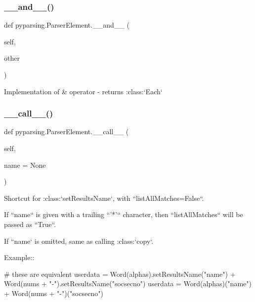 \subsubsection{\texorpdfstring{\+\_\+\+\_\+and\+\_\+\+\_\+()}{\_\_and\_\_()}}
{\footnotesize\ttfamily def pyparsing.\+Parser\+Element.\+\_\+\+\_\+and\+\_\+\+\_\+ (\begin{DoxyParamCaption}\item[{}]{self,  }\item[{}]{other }\end{DoxyParamCaption})}

\begin{DoxyVerb}Implementation of & operator - returns :class:`Each`
\end{DoxyVerb}
 \mbox{\label{classpyparsing_1_1ParserElement_a46450a967b8cf18e76e893532de0ecd7}} 
\subsubsection{\texorpdfstring{\+\_\+\+\_\+call\+\_\+\+\_\+()}{\_\_call\_\_()}}
{\footnotesize\ttfamily def pyparsing.\+Parser\+Element.\+\_\+\+\_\+call\+\_\+\+\_\+ (\begin{DoxyParamCaption}\item[{}]{self,  }\item[{}]{name = {\ttfamily None} }\end{DoxyParamCaption})}

\begin{DoxyVerb}Shortcut for :class:`setResultsName`, with ``listAllMatches=False``.

If ``name`` is given with a trailing ``'*'`` character, then ``listAllMatches`` will be
passed as ``True``.

If ``name` is omitted, same as calling :class:`copy`.

Example::

    # these are equivalent
    userdata = Word(alphas).setResultsName("name") + Word(nums + "-").setResultsName("socsecno")
    userdata = Word(alphas)("name") + Word(nums + "-")("socsecno")
\end{DoxyVerb}
 \mbox{\label{classpyparsing_1_1ParserElement_adff8e67070c5b194296539a11fa5c322}} 
